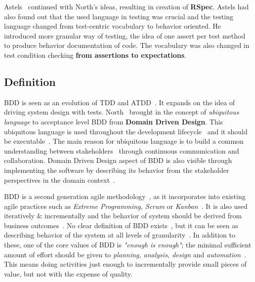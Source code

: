     Astels~\cite{astels2006new} continued with North's ideas, resulting in creation of \textbf{RSpec}. Astels had also found
    out that the used language in testing was crucial and the testing language changed from test-centric vocabulary to behavior oriented.
    He introduced more granular way of testing, the idea of one assert per test method to produce behavior documentation of code.
    The vocabulary was also changed in test condition checking \textbf{from assertions to expectations}.

    \subsection{Definition}
    BDD is seen as an evolution of TDD and ATDD~\cite{solis2011study}. It expands on the idea of driving system design with
    tests. North~\cite{bdd2006north} brought in the concept of \textit{ubiquitous language} to acceptance level BDD from \textbf{Domain Driven Design}.
    This ubiquitous language is used throughout the development lifecycle~\cite{solis2011study} and it should be executable~\cite{bdd2006north}.
    The main reason for ubiquitous language is to build a common understanding between stakeholders~\cite{solis2011study} through
    continuous communication and collaboration.
    Domain Driven Design aspect of BDD is also visible through implementing the software by describing its behavior from
    the stakeholder perspectives in the domain context~\cite{chelimsky2010rspec}.

    BDD is a second generation agile methodology~\cite{chelimsky2010rspec}, as it incorporates into existing agile practices such as
    \textit{Extreme Programming, Scrum} or \textit{Kanban}~\cite{smart2014bdd}. It is also used iteratively \& incrementally and the behavior
    of system should be derived from business outcomes~\cite{solis2011study}.
    No clear definition of BDD exists~\cite{okolnychyi2016study}, but it can be seen as describing behavior of the system
    at all levels of granularity~\cite{chelimsky2010rspec}.
    In addition to these, one of the core values of BDD is \textit{"enough is enough"};
    the minimal sufficient amount of effort should be given to \textit{planning, analysis, design} and \textit{automation}~\cite{chelimsky2010rspec}.
    This means doing activities just enough to incrementally provide small pieces of value, but not with the expense of
    quality.


